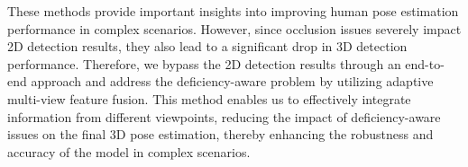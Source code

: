 These methods provide important insights into improving human pose estimation performance in complex scenarios. 
However, since occlusion issues severely impact 2D detection results, they also lead to a significant drop in 3D detection performance.
Therefore, we bypass the 2D detection results through an end-to-end approach and address the deficiency-aware problem by utilizing adaptive multi-view feature fusion. 
This method enables us to effectively integrate information from different viewpoints, reducing the impact of deficiency-aware issues on the final 3D pose estimation, thereby enhancing the robustness and accuracy of the model in complex scenarios.